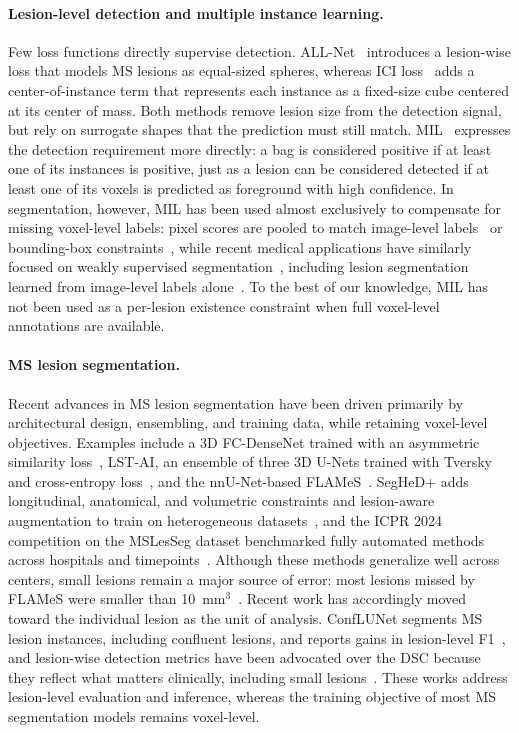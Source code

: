 \paragraph{Lesion-level detection and multiple instance learning.}
Few loss functions directly supervise detection. ALL-Net~\cite{zhang_all-net_2021}
introduces a lesion-wise loss that models MS lesions as equal-sized spheres,
whereas ICI loss~\cite{rachmadi_improving_2024} adds a center-of-instance
term that represents each instance as a fixed-size cube centered at its
center of mass. Both methods remove lesion size from the detection signal,
but rely on surrogate shapes that the prediction must still match.
MIL~\cite{dietterich_solving_1997,ilse_attention-based_2018} expresses the
detection requirement more directly: a bag is considered positive if at
least one of its instances is positive, just as a lesion can be considered
detected if at least one of its voxels is predicted as foreground with high
confidence. In segmentation, however, MIL has been used almost exclusively
to compensate for missing voxel-level labels: pixel scores are pooled to
match image-level labels~\cite{pinheiro_image-level_2015} or bounding-box
constraints~\cite{hsu_weakly_2019}, while recent medical applications have
similarly focused on weakly supervised
segmentation~\cite{liu_object_2026,huang_geometric_2026,pal_deep_2021},
including lesion segmentation learned from image-level labels
alone~\cite{cheng_fmamil_2025}. To
the best of our knowledge, MIL has not been used as a per-lesion existence
constraint when full voxel-level annotations are available.

\paragraph{MS lesion segmentation.}
Recent advances in MS lesion segmentation have been driven primarily by
architectural design, ensembling, and training data, while retaining
voxel-level objectives. Examples include a 3D FC-DenseNet trained with an
asymmetric similarity loss~\cite{hashemi_asymmetric_2019}, LST-AI, an
ensemble of three 3D U-Nets trained with Tversky and cross-entropy
loss~\cite{wiltgen_lst-ai_2024}, and the nnU-Net-based
FLAMeS~\cite{dereskewicz_flames_2025}. SegHeD+ adds longitudinal,
anatomical, and volumetric constraints and lesion-aware augmentation to
train on heterogeneous datasets~\cite{basaran_seghed_2024}, and the ICPR
2024 competition on the MSLesSeg dataset benchmarked fully automated
methods across hospitals and timepoints~\cite{rondinella_icpr_2024}.
Although these methods generalize well across centers, small lesions remain
a major source of error: most lesions missed by FLAMeS were smaller than
10~mm$^3$~\cite{dereskewicz_flames_2025}. Recent work has accordingly moved
toward the individual lesion as the unit of analysis. ConfLUNet segments
MS lesion instances, including confluent lesions, and reports gains in
lesion-level F1~\cite{wynen_conflunet_2025}, and lesion-wise detection
metrics have been advocated over the DSC because they reflect what matters
clinically, including small lesions~\cite{basit_rethinking_2026}. These
works address lesion-level evaluation and inference, whereas the training
objective of most MS segmentation models remains voxel-level.

